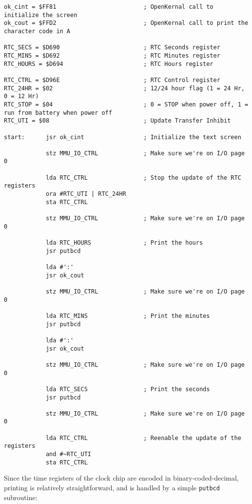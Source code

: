 \begin{verbatim}
ok_cint = $FF81							; OpenKernal call to initialize the screen
ok_cout = $FFD2							; OpenKernal call to print the character code in A

RTC_SECS = $D690						; RTC Seconds register
RTC_MINS = $D692						; RTC Minutes register
RTC_HOURS = $D694						; RTC Hours register

RTC_CTRL = $D96E						; RTC Control register
RTC_24HR = $02							; 12/24 hour flag (1 = 24 Hr, 0 = 12 Hr)
RTC_STOP = $04							; 0 = STOP when power off, 1 = run from battery when power off
RTC_UTI = $08							; Update Transfer Inhibit

start:      jsr ok_cint                 ; Initialize the text screen

            stz MMU_IO_CTRL             ; Make sure we're on I/O page 0

            lda RTC_CTRL                ; Stop the update of the RTC registers
            ora #RTC_UTI | RTC_24HR
            sta RTC_CTRL

            stz MMU_IO_CTRL				; Make sure we're on I/O page 0

            lda RTC_HOURS               ; Print the hours
            jsr putbcd

            lda #':'
            jsr ok_cout

            stz MMU_IO_CTRL				; Make sure we're on I/O page 0

            lda RTC_MINS                ; Print the minutes
            jsr putbcd

            lda #':'
            jsr ok_cout

            stz MMU_IO_CTRL				; Make sure we're on I/O page 0

            lda RTC_SECS                ; Print the seconds
            jsr putbcd

            stz MMU_IO_CTRL				; Make sure we're on I/O page 0

            lda RTC_CTRL                ; Reenable the update of the registers
            and #~RTC_UTI
            sta RTC_CTRL
\end{verbatim}

\nopagebreak[1] Since the time registers of the clock chip are encoded in binary-coded-decimal, printing is relatively straightforward, and is handled by a simple \verb+putbcd+ subroutine:

